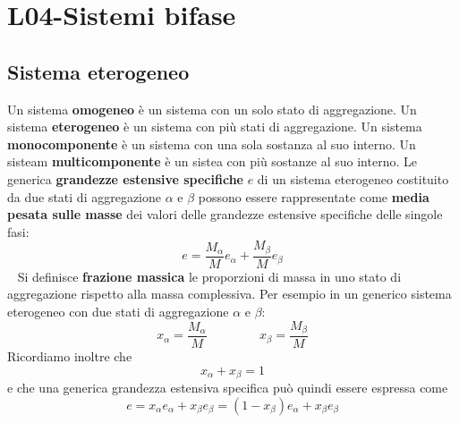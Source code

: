 \section{L04-Sistemi bifase}
\subsection{Sistema eterogeneo}
Un sistema \textbf{omogeneo} è un sistema con un solo stato di aggregazione.\newline
\newline
Un sistema \textbf{eterogeneo} è un sistema con più stati di aggregazione.\newline
\newline
Un sistema \textbf{monocomponente} è un sistema con una sola sostanza al suo interno.\newline
\newline
Un sisteam \textbf{multicomponente} è un sistea con più sostanze al suo interno.\newline
\newline
Le generica \textbf{grandezze estensive specifiche} $e$ di un sistema eterogeneo costituito da due stati di aggregazione $\alpha$ e $\beta$ possono essere rappresentate come \textbf{media pesata sulle masse} dei valori delle grandezze estensive specifiche delle singole fasi:
\[
    e = \frac{M_\alpha}{M}e_{\alpha} + \frac{M_\beta}{M}e_\beta
\]
\ \newline
Si definisce \textbf{frazione massica} le proporzioni di massa in uno stato di aggregazione rispetto alla massa complessiva. Per esempio in un generico sistema eterogeneo con due stati di aggregazione $\alpha$ e $\beta$:
\[
    x_\alpha = \frac{M_\alpha}{M} \;\;\;\;\;\;\;\;\;\;\;\;\;\;\; x_\beta = \frac{M_\beta}{M}
\]
Ricordiamo inoltre che 
\[
    x_\alpha + x_\beta = 1
\]
e che una generica grandezza estensiva specifica può quindi essere espressa come
\[
    e = x_\alpha e_\alpha + x_\beta e_\beta = (1-x_\beta)e_\alpha + x_\beta e_\beta
\]
